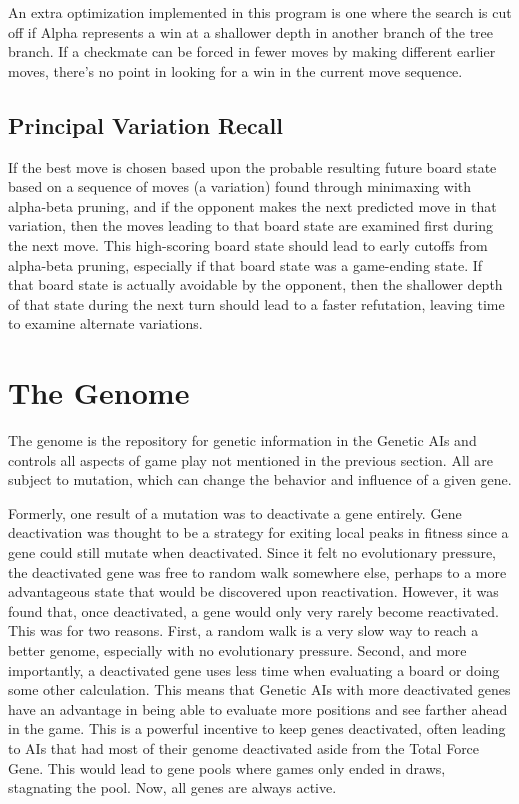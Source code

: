 \documentclass[letterpaper]{article}
\renewcommand\_{\textunderscore\allowbreak}
\begin{document}
An extra optimization implemented in this program is one where the search is cut off if Alpha represents a win at a shallower depth in another branch of the tree branch. If a checkmate can be forced in fewer moves by making different earlier moves, there's no point in looking for a win in the current move sequence.

\subsection{Principal Variation Recall}

If the best move is chosen based upon the probable resulting future board state based on a sequence of moves (a variation) found through minimaxing with alpha-beta pruning, and if the opponent makes the next predicted move in that variation, then the moves leading to that board state are examined first during the next move. This high-scoring board state should lead to early cutoffs from alpha-beta pruning, especially if that board state was a game-ending state. If that board state is actually avoidable by the opponent, then the shallower depth of that state during the next turn should lead to a faster refutation, leaving time to examine alternate variations.


\section{The Genome}
\label{gene-section}
The genome is the repository for genetic information in the Genetic AIs and controls all aspects of game play not mentioned in the previous section. All are subject to mutation, which can change the behavior and influence of a given gene.

Formerly, one result of a mutation was to deactivate a gene entirely. Gene deactivation was thought to be a strategy for exiting local peaks in fitness since a gene could still mutate when deactivated. Since it felt no evolutionary pressure, the deactivated gene was free to random walk somewhere else, perhaps to a more advantageous state that would be discovered upon reactivation. However, it was found that, once deactivated, a gene would only very rarely become reactivated. This was for two reasons. First, a random walk is a very slow way to reach a better genome, especially with no evolutionary pressure. Second, and more importantly, a deactivated gene uses less time when evaluating a board or doing some other calculation. This means that Genetic AIs with more deactivated genes have an advantage in being able to evaluate more positions and see farther ahead in the game. This is a powerful incentive to keep genes deactivated, often leading to AIs that had most of their genome deactivated aside from the Total Force Gene. This would lead to gene pools where games only ended in draws, stagnating the pool. Now, all genes are always active.
\end{document}
